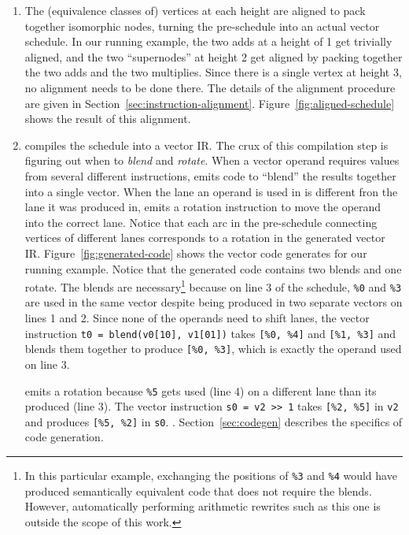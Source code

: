 \begin{enumerate}
    \item The (equivalence classes of) vertices at each height are aligned to pack together isomorphic nodes, turning the pre-schedule into an actual vector schedule. 
    In our running example, the two adds at a height of 1 get trivially aligned, and the two ``supernodes'' at height 2 get aligned by packing together the two adds and the two multiplies.
    Since there is a single vertex at height 3, no alignment needs to be done there. 
    The details of the alignment procedure are given in Section~\ref{sec:instruction-alignment}.
    Figure~\ref{fig:aligned-schedule} shows the result of this alignment.
    \item \system compiles the schedule into a vector IR. The crux of this compilation step is figuring out when to {\em blend} and {\em rotate}. When a vector operand requires values from several different instructions, \system emits code to ``blend'' the results together into a single vector.
    When the lane an operand is used in is different fron the lane it was produced in, \system emits a rotation instruction to move the operand into the correct lane. Notice that each arc in the pre-schedule connecting vertices of different lanes corresponds to a rotation in the generated vector IR.
    Figure~\ref{fig:generated-code} shows the vector code \system generates for our running example.
    Notice that the generated code contains two blends and one rotate.
    The blends are necessary\footnote{In this particular example, exchanging the positions of \texttt{\%3} and \texttt{\%4} would have produced semantically equivalent code that does not require the blends. However, automatically performing arithmetic rewrites such as this one is outside the scope of this work. } because on line 3 of the schedule, \texttt{\%0} and \texttt{\%3} are used in the same vector despite being produced in two separate vectors on lines 1 and 2. 
    Since none of the operands need to shift lanes, the vector instruction \texttt{t0 = blend(v0[10], v1[01])} takes \texttt{[\%0, \%4]} and \texttt{[\%1, \%3]} and blends them together to produce \texttt{[\%0, \%3]}, which is exactly the operand used on line 3. 

    \system emits a rotation because \texttt{\%5} gets used (line 4) on a different lane than its produced (line 3).
    The vector instruction \texttt{s0 = v2 >> 1} takes \texttt{[\%2, \%5]} in \texttt{v2} and produces \texttt{[\%5, \%2]} in \texttt{s0}.
    .
    Section~\ref{sec:codegen} describes the specifics of code generation.
\end{enumerate}

